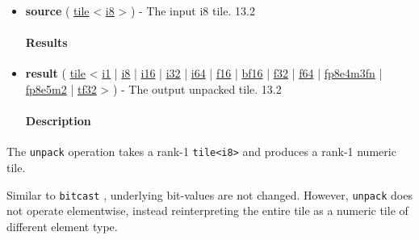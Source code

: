 \documentclass{article}
\begin{document}
\begin{itemize}
\item \textbf{source} ( \href{https://docs.nvidia.com/cuda/tile-ir/latest/sections/types.html#type-tile}{tile} < \href{https://docs.nvidia.com/cuda/tile-ir/latest/sections/types.html#subsection-element-types}{i8} > ) - The input i8 tile. 13.2


\paragraph{Results}

\item \textbf{result} ( \href{https://docs.nvidia.com/cuda/tile-ir/latest/sections/types.html#type-tile}{tile} < \href{https://docs.nvidia.com/cuda/tile-ir/latest/sections/types.html#subsection-element-types}{i1} | \href{https://docs.nvidia.com/cuda/tile-ir/latest/sections/types.html#subsection-element-types}{i8} | \href{https://docs.nvidia.com/cuda/tile-ir/latest/sections/types.html#subsection-element-types}{i16} | \href{https://docs.nvidia.com/cuda/tile-ir/latest/sections/types.html#subsection-element-types}{i32} | \href{https://docs.nvidia.com/cuda/tile-ir/latest/sections/types.html#subsection-element-types}{i64} | \href{https://docs.nvidia.com/cuda/tile-ir/latest/sections/types.html#subsection-element-types}{f16} | \href{https://docs.nvidia.com/cuda/tile-ir/latest/sections/types.html#subsection-element-types}{bf16} | \href{https://docs.nvidia.com/cuda/tile-ir/latest/sections/types.html#subsection-element-types}{f32} | \href{https://docs.nvidia.com/cuda/tile-ir/latest/sections/types.html#subsection-element-types}{f64} | \href{https://docs.nvidia.com/cuda/tile-ir/latest/sections/types.html#subsection-element-types}{fp8e4m3fn} | \href{https://docs.nvidia.com/cuda/tile-ir/latest/sections/types.html#subsection-element-types}{fp8e5m2} | \href{https://docs.nvidia.com/cuda/tile-ir/latest/sections/types.html#subsection-element-types}{tf32} > ) - The output unpacked tile. 13.2


\paragraph{Description}

\end{itemize}
The \texttt{unpack} operation takes a rank-1 \texttt{tile<i8>} and produces a rank-1 numeric tile.


Similar to \texttt{bitcast} , underlying bit-values are not changed. However, \texttt{unpack} does not operate elementwise, instead reinterpreting the entire tile as a numeric tile of different element type.
\end{document}
